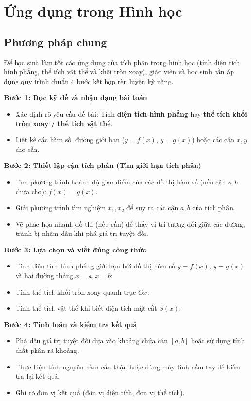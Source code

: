\documentclass[12pt,a4paper,oneside]{book}
\theoremstyle{theorem}
\theoremstyle{definition}
\begin{document}
\section{Ứng dụng trong Hình học}
\subsection{Phương pháp chung}

Để học sinh làm tốt các ứng dụng của tích phân trong hình học (tính diện tích hình phẳng, thể tích vật thể và khối tròn xoay), giáo viên và học sinh cần áp dụng quy trình chuẩn 4 bước kết hợp rèn luyện kỹ năng.

\textbf{Bước 1: Đọc kỹ đề và nhận dạng bài toán}
\begin{itemize}
    \item Xác định rõ yêu cầu đề bài: Tính \textbf{diện tích hình phẳng} hay \textbf{thể tích khối tròn xoay / thể tích vật thể}.
    \item Liệt kê các hàm số, đường giới hạn ($y = f(x)$, $y = g(x)$) hoặc các cận $x,y$ cho sẵn.
\end{itemize}

\textbf{Bước 2: Thiết lập cận tích phân (Tìm giới hạn tích phân)}
\begin{itemize}
    \item Tìm phương trình hoành độ giao điểm của các đồ thị hàm số (nếu cận $a, b$ chưa cho): $f(x) = g(x)$.
    \item Giải phương trình tìm nghiệm $x_1, x_2$ để suy ra các cận $a, b$ của tích phân.
    \item Vẽ phác họa nhanh đồ thị (nếu cần) để thấy vị trí tương đối giữa các đường, tránh bị nhầm dấu khi phá giá trị tuyệt đối.
\end{itemize}

\textbf{Bước 3: Lựa chọn và viết đúng công thức}
\begin{itemize}
    \item Tính diện tích hình phẳng giới hạn bởi đồ thị hàm số $y=f(x)$, $y=g(x)$ và hai đường thảng $x=a, x=b$:
    \item Tính thể tích khối tròn xoay quanh trục $Ox$:
    \item Tính thể tích vật thể khi biết diện tích mặt cắt $S(x)$:
   
\end{itemize}

\textbf{Bước 4: Tính toán và kiểm tra kết quả}
\begin{itemize}
    \item Phá dấu giá trị tuyệt đối dựa vào khoảng chứa cận $[a, b]$ hoặc sử dụng tính chất phân rã khoảng.
    \item Thực hiện tính nguyên hàm cẩn thận hoặc dùng máy tính cầm tay để kiểm tra lại kết quả.
    \item Ghi rõ đơn vị kết quả (đơn vị diện tích, đơn vị thể tích).
\end{itemize}
\end{document}
